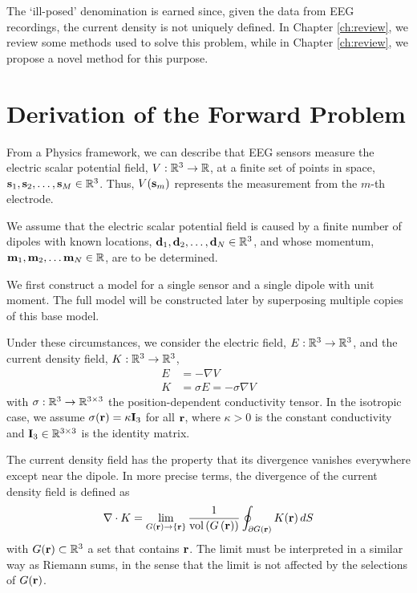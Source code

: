The `ill-posed' denomination is earned since, given the data from EEG recordings, the current density is not uniquely defined.
%
In Chapter \ref{ch:review}, we review some methods used to solve this problem, while in Chapter \ref{ch:review}, we propose a novel method for this purpose.


\section{Derivation of the Forward Problem}
\label{sec:forward_derivation}

From a Physics framework, we can describe that EEG sensors measure the electric scalar potential field, $V: \mathbb{R}^3 \rightarrow \mathbb{R}$, at a finite set of points in space, $\mathbf{s}_{1}, \mathbf{s}_2, \dots, \mathbf{s}_M \in \mathbb{R}^3$. 
%
Thus, $V(\mathbf{s}_m)$ represents the measurement from the $m$-th electrode.

We assume that the electric scalar potential field is caused by a finite number of dipoles with known locations, ${\mathbf{d}_1, \mathbf{d}_2, \dots, \mathbf{d}_N \in \mathbb{R}^3}$, and whose momentum, $\mathbf{m}_1, \mathbf{m}_2, \dots \mathbf{m}_N \in \mathbb{R}$, are to be determined.

We first construct a model for a single sensor and a single dipole with unit moment. 
%
The full model will be constructed later by superposing multiple copies of this base model.

Under these circumstances, we consider the electric field, $E: \mathbb{R}^3 \rightarrow \mathbb{R}^3$, and the current density field, $K: \mathbb{R}^3 \rightarrow \mathbb{R}^3$,
\begin{align}
E &= - \nabla V
\\
K &= \sigma E = - \sigma \nabla V
\label{eq:model1}
\end{align}
with $\sigma: \mathbb{R}^3 \rightarrow \mathbb{R}^{3\times 3}$ the position-dependent conductivity tensor. 
%
In the isotropic case, we assume
$\sigma(\mathbf{r}) = \kappa \mathbf{I}_3$
for all $\mathbf{r}$, where $\kappa>0$ is the constant conductivity and $\mathbf{I}_3 \in \mathbb{R}^{3\times 3}$ is the identity matrix.

The current density field has the property that its divergence vanishes everywhere except near the dipole.
%
In more precise terms, the divergence of the current density field is defined as
\begin{equation}
\nabla \cdot K = \lim_{G(\mathbf{r}) \rightarrow \left\{ \mathbf{r} \right\}} \frac{1}{\text{vol}\left( G\left( \mathbf{r} \right) \right)}
\oint_{\partial G(\mathbf{r})} K(\mathbf{r})\, dS
\end{equation}
with $G(\mathbf{r})\subset \mathbb{R}^3$ a set that contains $\mathbf{r}$. 
%
The limit must be interpreted in a similar way as Riemann sums, in the sense that the limit is not affected by the selections of $G(\mathbf{r})$.


